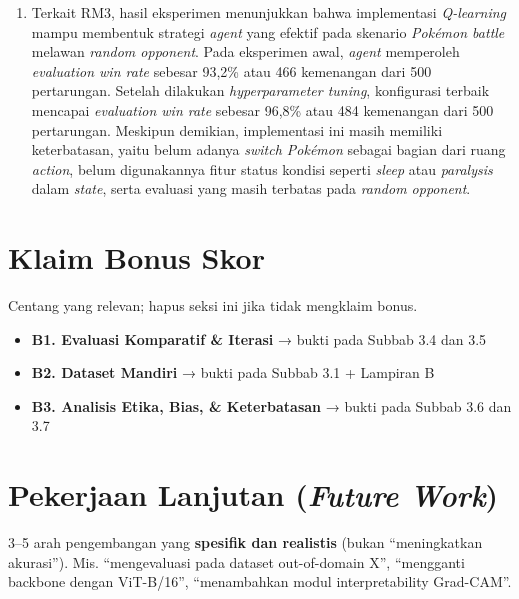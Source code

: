 \documentclass[11pt,a4paper,oneside]{report}
\begin{document}
\begin{enumerate}[leftmargin=*]
    \item Terkait RM3, hasil eksperimen menunjukkan bahwa implementasi \textit{Q-learning} mampu membentuk strategi \textit{agent} yang efektif pada skenario \textit{Pokémon battle} melawan \textit{random opponent}. Pada eksperimen awal, \textit{agent} memperoleh \textit{evaluation win rate} sebesar 93,2\% atau 466 kemenangan dari 500 pertarungan. Setelah dilakukan \textit{hyperparameter tuning}, konfigurasi terbaik mencapai \textit{evaluation win rate} sebesar 96,8\% atau 484 kemenangan dari 500 pertarungan. Meskipun demikian, implementasi ini masih memiliki keterbatasan, yaitu belum adanya \textit{switch Pokémon} sebagai bagian dari ruang \textit{action}, belum digunakannya fitur status kondisi seperti \textit{sleep} atau \textit{paralysis} dalam \textit{state}, serta evaluasi yang masih terbatas pada \textit{random opponent}.
\end{enumerate}

\section{Klaim Bonus Skor}
\begin{petunjuk}
Centang yang relevan; hapus seksi ini jika tidak mengklaim bonus.
\end{petunjuk}

\begin{itemize}[leftmargin=*]
    \item[$\boxtimes$] \textbf{B1. Evaluasi Komparatif \& Iterasi} → bukti pada Subbab 3.4 dan 3.5
    \item[$\boxtimes$] \textbf{B2. Dataset Mandiri} → bukti pada Subbab 3.1 + Lampiran B
    \item[$\boxtimes$] \textbf{B3. Analisis Etika, Bias, \& Keterbatasan} → bukti pada Subbab 3.6 dan 3.7
\end{itemize}

\section{Pekerjaan Lanjutan (\textit{Future Work})}
\begin{petunjuk}
3--5 arah pengembangan yang \textbf{spesifik dan realistis} (bukan ``meningkatkan akurasi''). Mis. ``mengevaluasi pada dataset out-of-domain X'', ``mengganti backbone dengan ViT-B/16'', ``menambahkan modul interpretability Grad-CAM''.
\end{petunjuk}
\end{document}
